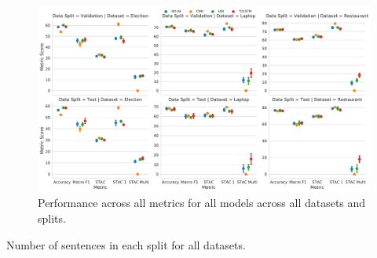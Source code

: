 \begin{figure}[ht!]
    \centering
    \includegraphics[scale=0.4]{images/augmentation/methods_performance/baseline/baseline_stac_scores.pdf}
    \caption{Performance across all metrics for all models across all datasets and splits.}
    \label{fig:baseline_stac_scores.png}
\end{figure}

\begin{table}[ht!]
    \centering
    
    \caption{Number of sentences in each split for all datasets.}
    \label{tab:aug_STAC_samples_stats}
\end{table}

\FloatBarrier
